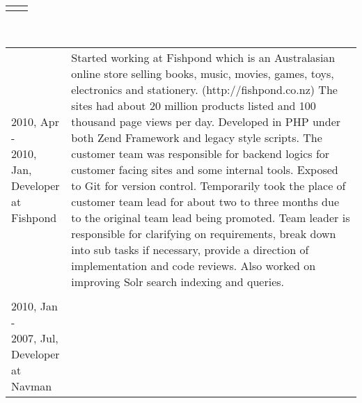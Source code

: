 \begin{resume}
\begin{tabular}{ll}
{}\end{tabular}\\
\begin{tabular}{ll}
\parbox[t]{35mm}{2010, Apr - \\ 2010, Jan,\\Developer\\at Fishpond} & \parbox[t]{111mm}{

Started working at Fishpond which is an Australasian online store selling books, music, movies, games, toys, electronics and stationery. (http://fishpond.co.nz) The sites had about 20 million products listed and 100 thousand page views per day. Developed in PHP under both Zend Framework and legacy style scripts. The customer team was responsible for backend logics for customer facing sites and some internal tools. Exposed to Git for version control. Temporarily took the place of customer team lead for about two to three months due to the original team lead being promoted. Team leader is responsible for clarifying on requirements, break down into sub tasks if necessary, provide a direction of implementation and code reviews. Also worked on improving Solr search indexing and queries. 

}\\\\
\parbox[t]{35mm}{2010, Jan - \\ 2007, Jul,\\Developer\\at Navman} & \parbox[t]{111mm}{

}
\end{tabular}
\end{resume}
